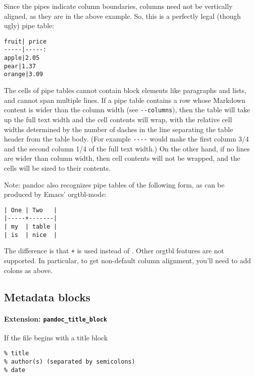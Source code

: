 \documentclass[]{article}
\begin{document}
Since the pipes indicate column boundaries, columns need not be
vertically aligned, as they are in the above example. So, this is a
perfectly legal (though ugly) pipe table:

\begin{verbatim}
fruit| price
-----|-----:
apple|2.05
pear|1.37
orange|3.09
\end{verbatim}

The cells of pipe tables cannot contain block elements like paragraphs
and lists, and cannot span multiple lines. If a pipe table contains a
row whose Markdown content is wider than the column width (see
\texttt{-\/-columns}), then the table will take up the full text width
and the cell contents will wrap, with the relative cell widths
determined by the number of dashes in the line separating the table
header from the table body. (For example \texttt{-\/-\/-\textbar{}-}
would make the first column 3/4 and the second column 1/4 of the full
text width.) On the other hand, if no lines are wider than column width,
then cell contents will not be wrapped, and the cells will be sized to
their contents.

Note: pandoc also recognizes pipe tables of the following form, as can
be produced by Emacs' orgtbl-mode:

\begin{verbatim}
| One | Two   |
|-----+-------|
| my  | table |
| is  | nice  |
\end{verbatim}

The difference is that \texttt{+} is used instead of
\texttt{\textbar{}}. Other orgtbl features are not supported. In
particular, to get non-default column alignment, you'll need to add
colons as above.

\hypertarget{metadata-blocks}{%
\subsection{Metadata blocks}\label{metadata-blocks}}

\hypertarget{extension-pandoc_title_block}{%
\paragraph{\texorpdfstring{Extension:
\texttt{pandoc\_title\_block}}{Extension: pandoc\_title\_block}}\label{extension-pandoc_title_block}}

If the file begins with a title block

\begin{verbatim}
% title
% author(s) (separated by semicolons)
% date
\end{verbatim}
\end{document}
